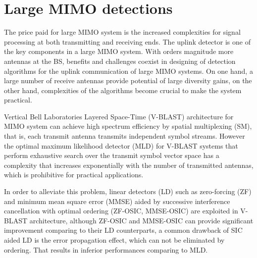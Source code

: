 \section{Large MIMO detections}
 The price paid for large MIMO system is the increased complexities for signal processing at both transmitting and receiving ends. The uplink detector is one of the key components in a large MIMO system. With orders magnitude more antennas at the BS, benefits and challenges coexist in designing of detection algorithms for the uplink communication of large MIMO systems. On one hand, a large number of receive antennas provide potential of large diversity gains, on the other hand, complexities of the algorithms become crucial to make the system practical. 
  
Vertical Bell Laboratories Layered Space-Time (V-BLAST) architecture for MIMO system can achieve high spectrum efficiency by spatial multiplexing (SM), that is, each transmit antenna transmits independent symbol streams. However the optimal maximum likelihood detector (MLD) for V-BLAST systems that perform exhaustive search over the transmit symbol vector space has a complexity that increases exponentially with the number of transmitted antennas, which is prohibitive for practical applications. 

In order to alleviate this problem, linear detectors (LD) such as zero-forcing (ZF) and minimum mean square error (MMSE) aided by successive interference cancellation with optimal ordering (ZF-OSIC, MMSE-OSIC) are exploited in V-BLAST architecture\cite{wolniansky1998v}\cite{foschini1999simplified}\cite{benesty2003fast}, although ZF-OSIC and MMSE-OSIC can provide significant improvement comparing to their LD counterparts, a common drawback of SIC aided LD is the error propagation effect, which can not be eliminated by ordering. That results in inferior performances comparing to MLD\cite{loyka2004performance}\cite{prasad2004analysis}\cite{jiang2005asymptotic}.
   

